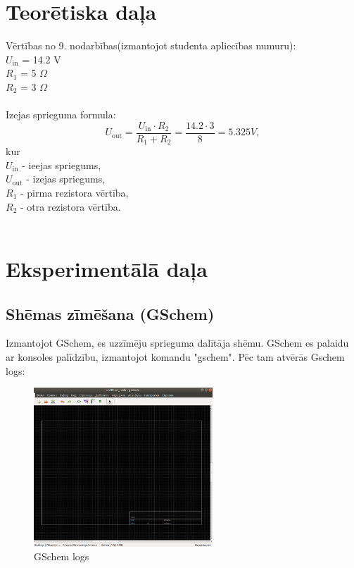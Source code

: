 \documentclass{article}
\begin{document}
\section{Teorētiska daļa}
    
    Vērtības no 9. nodarbības(izmantojot studenta apliecības numuru):\\$U_\text{in}$ = 14.2 V\\$R_1$ = 5 $\Omega$\\$R_2$ = 3 $\Omega$\\\\
    Izejas sprieguma formula: \begin{equation}U_\text{out} = \frac{U_\text{in}\cdot R_2}{R_1 + R_2} = \frac{14.2\cdot 3}{8} = 5.325 V,\label{eq1}\end{equation}kur\\$U_\text{in}$ - ieejas spriegums,\\$U_\text{out}$ - izejas spriegums,\\$R_1$ - pirma rezistora vērtība,\\$R_2$ - otra rezistora vērtība.\\\\
    
\newpage
\section{Eksperimentālā daļa}
    \subsection{Shēmas zīmēšana (GSchem)}
        Izmantojot GSchem, es uzzīmēju sprieguma dalītāja shēmu. GSchem es palaidu ar konsoles palīdzību, izmantojot komandu "gschem". Pēc tam atvērās Gschem logs:\\
        \begin{figure}[H]\centering\includegraphics[width=0.60\textwidth]{pictures/gschem1.PNG}\caption{GSchem logs}\label{picture:10lw1p}\end{figure}
        
\end{document}
